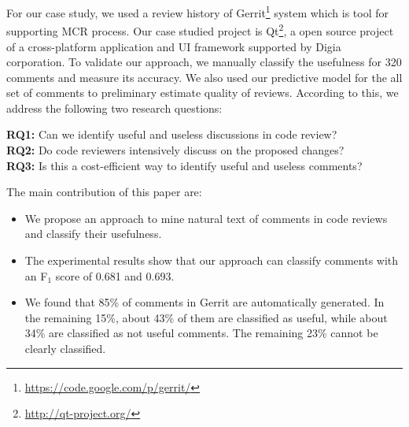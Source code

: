 For our case study, we used a review history of Gerrit\footnote{\url{https://code.google.com/p/gerrit/}} system which is tool for supporting MCR process. Our case studied project is Qt\footnote{\url{http://qt-project.org/}}, a open source project of a cross-platform application and UI framework supported by Digia corporation. To validate our approach, we manually classify the usefulness for 320 comments and measure its accuracy. We also used our predictive model for the all set of comments to preliminary estimate quality of reviews. According to this, we address the following two research questions:

\noindent \textbf{RQ1:} Can we identify useful and useless discussions in code review?\\
\noindent \textbf{RQ2:} Do code reviewers intensively discuss on the proposed changes?\\
\noindent \textbf{RQ3:} Is this a cost-efficient way to identify useful and useless comments?

\noindent The main contribution of this paper are:
\begin{itemize}
\item We propose an approach to mine natural text of comments in code reviews and classify their usefulness.
\item The experimental results show that our approach can classify comments with an F$_1$ score of 0.681 and 0.693.
\item We found that 85\% of comments in Gerrit are automatically generated. In the remaining 15\%, about 43\% of them are classified as useful, while about 34\% are classified as not useful comments. The remaining 23\% cannot be clearly classified.
\end{itemize} 

